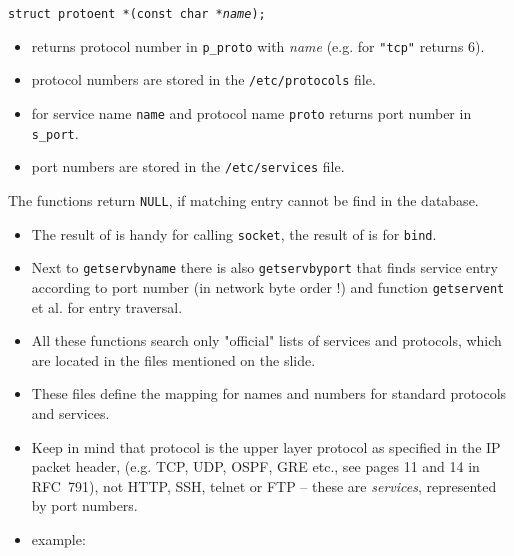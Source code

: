 \begin{slide}
\texttt{struct protoent *(const char *\emph{name});}
\begin{itemize}
\item returns protocol number in \texttt{p\_proto} with \emph{name}
(e.g. for \texttt{"tcp"} returns 6). 
\item protocol numbers are stored in the \texttt{/etc/protocols} file.
\end{itemize}
\begin{itemize}
\item for service name \texttt{name} and protocol name \texttt{proto}
returns port number in \texttt{s\_port}.
\item port numbers are stored in the \texttt{/etc/services} file.
\end{itemize}

The functions return \texttt{NULL}, if matching entry cannot be find in the
database.
\end{slide}

\begin{itemize}
\item The result of  is handy for calling \texttt{socket},
the result of  is for \texttt{bind}.
\item Next to \texttt{getservbyname} there is also \texttt{getservbyport}
that finds service entry according to port number (in network byte order !)
and function \texttt{getservent} et al. for entry traversal.
\item All these functions search only "official" lists of services and
protocols, which are located in the files mentioned on the slide.
\item These files define the mapping for names and numbers for standard
protocols and services.
\item Keep in mind that protocol is the upper layer protocol as specified in
the IP packet header, (e.g. TCP, UDP, OSPF, GRE etc., see pages 11 and 14 in
RFC~791), not HTTP, SSH, telnet or FTP -- these are \emph{services}, represented
by port numbers.
\item \label{GETBYNAME} example: 
\end{itemize}


